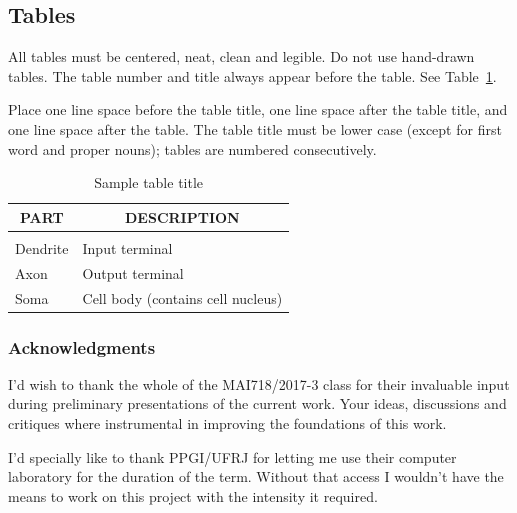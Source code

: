 \documentclass{article} %
\begin{document}
\subsection{Tables}

All tables must be centered, neat, clean and legible. Do not use hand-drawn
tables. The table number and title always appear before the table. See
Table~\ref{sample-table}.

Place one line space before the table title, one line space after the table
title, and one line space after the table. The table title must be lower case
(except for first word and proper nouns); tables are numbered consecutively.

\begin{table}[t]
\caption{Sample table title}
\label{sample-table}
\begin{center}
\begin{tabular}{ll}
\multicolumn{1}{c}{\bf PART}  &\multicolumn{1}{c}{\bf DESCRIPTION}
\\ \hline \\
Dendrite         &Input terminal \\
Axon             &Output terminal \\
Soma             &Cell body (contains cell nucleus) \\
\end{tabular}
\end{center}
\end{table}




\subsubsection*{Acknowledgments}
I'd wish to thank the whole of the MAI718/2017-3 class for their invaluable input during preliminary presentations of the current work. Your ideas, discussions and critiques where instrumental in improving the foundations of this work. 

I'd specially like to thank PPGI/UFRJ for letting me use their computer laboratory for the duration of the term. Without that access I wouldn't have the means to work on this project with the intensity it required.



\end{document}
